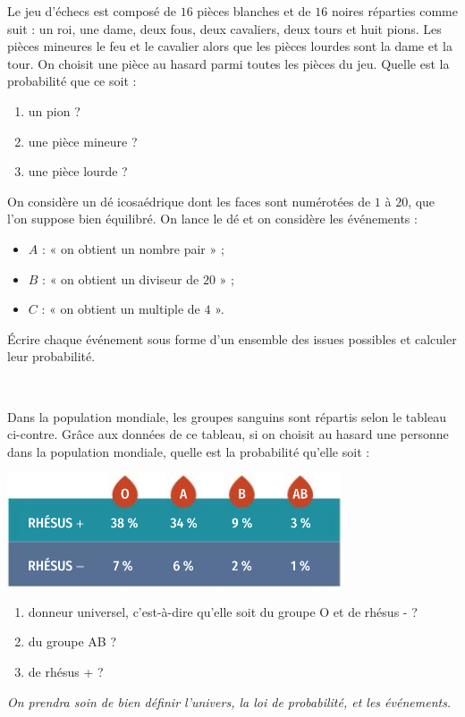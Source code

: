 \documentclass[11pt]{article}
\begin{document}
\begin{exo}
  Le jeu d'échecs est composé de $16$ pièces blanches et de $16$ noires
  réparties comme suit : un roi, une dame, deux fous, deux cavaliers, deux tours
  et huit pions. Les pièces mineures le feu et le cavalier alors que les pièces
  lourdes sont la dame et la tour. On choisit une pièce au hasard parmi toutes
  les pièces du jeu. Quelle est la probabilité que ce soit :
  \begin{enumerate}
    \item un pion ?
    \item une pièce mineure ?
    \item une pièce lourde ?
  \end{enumerate}
\end{exo}

\begin{exo}
  On considère un dé icosaédrique dont les faces sont numérotées de $1$ à $20$,
  que l'on suppose bien équilibré. On lance le dé et on considère les événements
  :
  \begin{itemize}
    \item $A$ : « on obtient un nombre pair » ;
    \item $B$ : « on obtient un diviseur de $20$ » ;
    \item $C$ : « on obtient un multiple de $4$ ».
  \end{itemize}
  Écrire chaque événement sous forme d'un ensemble des issues possibles et
  calculer leur probabilité.
\end{exo}

\begin{exo}~\\
  \begin{minipage}[]{.5\textwidth}
    Dans la population mondiale, les groupes sanguins sont répartis selon le
    tableau ci-contre. Gr\^ace aux données de ce tableau, si on choisit au
    hasard une personne dans la population mondiale, quelle est la probabilité
    qu'elle soit :
  \end{minipage}
  \begin{minipage}[]{.5\textwidth}
    \begin{center}
      \includegraphics[scale=.6]{sang.png}
    \end{center}
  \end{minipage}
  \begin{enumerate}
    \item donneur universel, c'est-à-dire qu'elle soit du groupe O et de
        rhésus - ?
    \item du groupe AB ?
    \item de rhésus + ?
  \end{enumerate}
  \emph{On prendra soin de bien définir l'univers, la loi de probabilité, et les
  événements.}
\end{exo}
\end{document}

